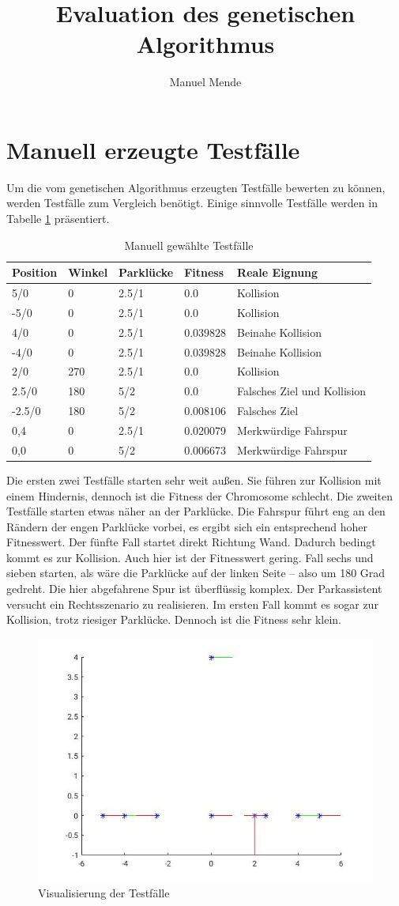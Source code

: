 \documentclass[12pt,a4paper]{article}
\author{Manuel Mende}
\title{Evaluation des genetischen Algorithmus}
\begin{document}
\maketitle
\tableofcontents
\section{Manuell erzeugte Testfälle}
Um die vom genetischen Algorithmus erzeugten Testfälle bewerten zu können, werden Testfälle zum Vergleich benötigt. Einige sinnvolle Testfälle werden in Tabelle \ref{tab:testfaelle} präsentiert.
\begin{table}\centering
\begin{tabular}{l|l|l|l|l}
Position & Winkel & Parklücke & Fitness & Reale Eignung \\\hline
5/0 & 0 & 2.5/1 & $0.0$ & Kollision \\
-5/0 & 0 & 2.5/1 & $0.0$ & Kollision \\
4/0 & 0 & 2.5/1 & $0.039828$ & Beinahe Kollision \\
-4/0 & 0 & 2.5/1 & $0.039828$ & Beinahe Kollision \\
2/0 & 270 & 2.5/1 & $0.0$ & Kollision \\
2.5/0 & 180 & 5/2 & $0.0$ & Falsches Ziel und Kollision \\
-2.5/0 & 180 & 5/2 & $0.008106$ & Falsches Ziel \\
0,4 &  0 & 2.5/1 & 0.020079 & Merkwürdige Fahrspur \\
0,0 &  0 & 5/2 & 0.006673 & Merkwürdige Fahrspur \\
\end{tabular}
\caption{Manuell gewählte Testfälle}
\label{tab:testfaelle}
\end{table}
Die ersten zwei Testfälle starten sehr weit außen. Sie führen zur Kollision mit einem Hindernis, dennoch ist die Fitness der Chromosome schlecht. Die zweiten Testfälle starten etwas näher an der Parklücke. Die Fahrspur führt eng an den Rändern der engen Parklücke vorbei, es ergibt sich ein entsprechend hoher Fitnesswert. Der fünfte Fall startet direkt Richtung Wand. Dadurch bedingt kommt es zur Kollision. Auch hier ist der Fitnesswert gering. Fall sechs und sieben starten, als wäre die Parklücke auf der linken Seite -- also um 180 Grad gedreht. Die hier abgefahrene Spur ist überflüssig komplex. Der Parkassistent versucht ein Rechtsszenario zu realisieren. Im ersten Fall kommt es sogar zur Kollision, trotz riesiger Parklücke. Dennoch ist die Fitness sehr klein.
\begin{figure}\centering
\includegraphics[width=.6\textwidth]{myTestcases.jpg}
\caption{Visualisierung der Testfälle}
\label{fig:testcases}
\end{figure}
\end{document}
